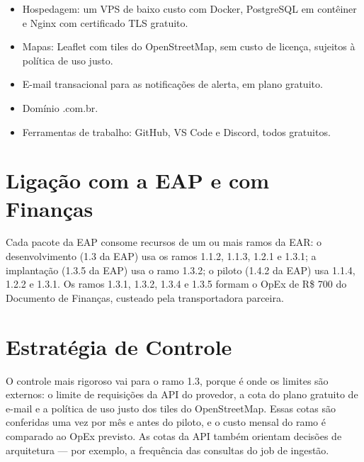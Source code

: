 \documentclass[11pt,a4paper]{article}
\begin{document}
\begin{itemize}[itemsep=4pt]
\begin{itemize}[itemsep=3pt]
\begin{itemize}[itemsep=1pt]
      \item[\textbf{1.3.2}] Hospedagem: um VPS de baixo custo com Docker, PostgreSQL em contêiner e Nginx com certificado TLS gratuito.
      \item[\textbf{1.3.3}] Mapas: Leaflet com tiles do OpenStreetMap, sem custo de licença, sujeitos à política de uso justo.
      \item[\textbf{1.3.4}] E-mail transacional para as notificações de alerta, em plano gratuito.
      \item[\textbf{1.3.5}] Domínio .com.br.
      \item[\textbf{1.3.6}] Ferramentas de trabalho: GitHub, VS Code e Discord, todos gratuitos.
    \end{itemize}
  \end{itemize}
\end{itemize}

\section{Ligação com a EAP e com Finanças}
Cada pacote da EAP consome recursos de um ou mais ramos da EAR: o desenvolvimento (1.3 da EAP) usa os ramos 1.1.2, 1.1.3, 1.2.1 e 1.3.1; a implantação (1.3.5 da EAP) usa o ramo 1.3.2; o piloto (1.4.2 da EAP) usa 1.1.4, 1.2.2 e 1.3.1. Os ramos 1.3.1, 1.3.2, 1.3.4 e 1.3.5 formam o OpEx de R\$ 700 do Documento de Finanças, custeado pela transportadora parceira.

\section{Estratégia de Controle}
O controle mais rigoroso vai para o ramo 1.3, porque é onde os limites são externos: o limite de requisições da API do provedor, a cota do plano gratuito de e-mail e a política de uso justo dos tiles do OpenStreetMap. Essas cotas são conferidas uma vez por mês e antes do piloto, e o custo mensal do ramo é comparado ao OpEx previsto. As cotas da API também orientam decisões de arquitetura --- por exemplo, a frequência das consultas do job de ingestão.
\end{document}
